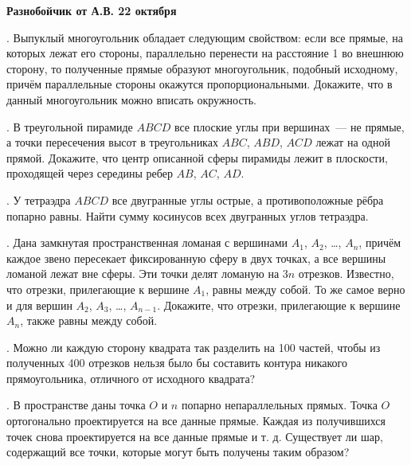 \centerline{\bf Разнобойчик от А.В. 22 октября}

. Выпуклый многоугольник обладает следующим свойством: если все прямые, на которых лежат
его стороны, параллельно перенести на расстояние 1 во внешнюю сторону, то полученные прямые
образуют многоугольник, подобный исходному, причём параллельные стороны окажутся
пропорциональными. Докажите, что в данный многоугольник можно вписать окружность.

. В треугольной пирамиде $ABCD$ все плоские углы при вершинах~--- не прямые, 
а точки пересечения высот в треугольниках $ABC$, $ABD$, $ACD$ лежат на одной прямой. 
Докажите, что центр описанной сферы пирамиды лежит в плоскости, 
проходящей через середины ребер $AB$, $AC$, $AD$.

. У тетраэдра $ABCD$ все двугранные углы острые, а противоположные рёбра попарно
равны. Найти сумму косинусов всех двугранных углов тетраэдра.

. Дана замкнутая пространственная ломаная с вершинами $A_1$, $A_2$, \ldots, $A_n$,
причём каждое звено пересекает фиксированную сферу в двух точках, а все вершины ломаной
лежат вне сферы. Эти точки делят ломаную на $3n$ отрезков. 
Известно, что отрезки, прилегающие к вершине $A_1$, равны между собой. 
То же самое верно и для вершин $A_2$, $A_3$, \ldots, $A_{n-1}$. 
Докажите, что отрезки, прилегающие к вершине $A_n$, также равны между собой.


. Можно ли каждую сторону квадрата так разделить на 100 частей, чтобы из полученных 400 отрезков нельзя 
было бы составить контура никакого прямоугольника, отличного от исходного квадрата?

. В пространстве даны точка $O$ и $n$ попарно непараллельных прямых. Точка $O$ ортогонально проектируется на
все данные прямые. Каждая из получившихся точек снова проектируется на все данные прямые и т. д. Существует
ли шар, содержащий все точки, которые могут быть получены таким образом?
